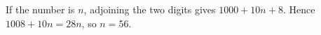 If the number is $n$, adjoining the two digits gives $1000+10n+8$. Hence $1008+10n=28n$, so $\boxed{n=56}$.
